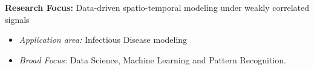 \par{\textbf{Research Focus: } Data-driven spatio-temporal modeling under weakly correlated signals\vspace{0.5em}
\begin{itemize}
  \item \textit{Application area:} Infectious Disease modeling\\
  \item \textit{Broad Focus:} Data Science, Machine Learning and Pattern Recognition.\\
\end{itemize}
}
\vspace{1em}
